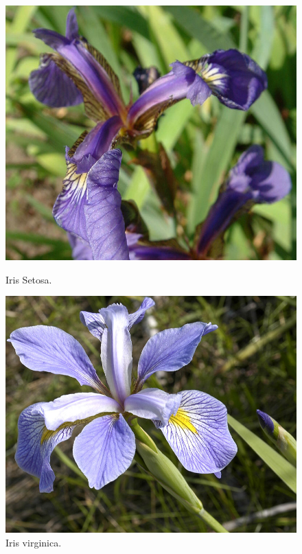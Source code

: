 \documentclass[a4paper, 20pt]{article}
\begin{document}
{\begin{figure}[h]
  \centering
  \begin{minipage}[h]{0.29\textwidth}
    \includegraphics[width=\textwidth]{dani/setosa.jpg}
    \caption{Iris Setosa.}
  \end{minipage}
  \hfill
  \begin{minipage}[h]{0.3\textwidth}
    \includegraphics[width=\textwidth]{dani/virginica.jpg}
    \caption{Iris virginica.}
  \end{minipage}
  \hfill

\end{figure}}
\end{document}
